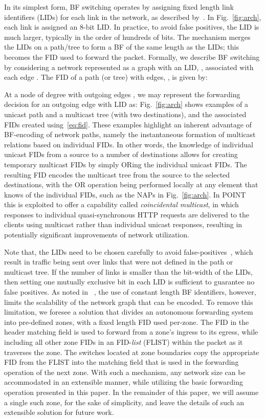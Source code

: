 \documentclass[conference]{IEEEtran}
\newcommand{\figref}[1]{Fig.~\ref{#1}}
\begin{document}
In its simplest form, BF switching operates by assigning fixed length link identifiers (LIDs) for each link in the network, as described by~\cite{Jokela09}.  In \figref{fig:arch}, each link is assigned an 8-bit LID. In practice, to avoid false positives, the LID is much larger, typically in the order of hundreds of bits. The mechanism merges the LIDs on a path/tree to form a BF of the same length as the LIDs; this becomes the FID used to forward the packet.  Formally, we describe BF switching by considering a network represented as a graph  with an LID, , associated with each edge . The FID  of a path (or tree) with  edges, , is given by: 

At a node  of degree  with outgoing edges , we may represent the forwarding decision  for an outgoing edge  with LID  as: 
\figref{fig:arch} shows examples of a unicast path and a multicast tree (with two destinations), and the associated FIDs created using~\eqref{eq:fid}. These examples highlight an inherent advantage of BF-encoding of network paths, namely the instantaneous formation of multicast relations based on individual FIDs. In other words, the knowledge of individual unicast FIDs from a source to a number of destinations allows for creating temporary multicast FIDs by simply ORing the individual unicast FIDs. The resulting FID encodes the multicast tree from the source to the selected destinations, with the OR operation being performed locally at any element that knows of the individual FIDs, such as the NAPs in \figref{fig:arch}. In POINT~\cite{Trossen2015} this is exploited to offer a capability called \emph{coincidental multicast}, in which responses to individual quasi-synchronous HTTP requests are delivered to the clients using multicast rather than individual unicast responses, resulting in potentially significant improvements of network utilization.

Note that, the LIDs need to be chosen carefully to avoid false-positives~\cite{Jokela09}, which result in traffic being sent over links that were not defined in the path or multicast tree. If the number of links  is smaller than the bit-width of the LIDs, then setting one mutually exclusive bit in each LID is sufficient to guarantee no false positives. As noted in ~\cite{Zahemszky2010}, the use of constant length BF identifiers, however, limits the scalability of the network graph that can be encoded. To remove this limitation, we foresee a solution that divides an autonomous forwarding system into pre-defined zones, with a fixed length FID used per-zone. The FID in the header matching field is used to forward from a zone's ingress to its egress, while including all other zone FIDs in an FID-\emph{list} (FLIST) within the packet as it traverses the zone. The switches located at zone boundaries copy the appropriate FID from the FLIST into the matching field that is used in the forwarding operation of the next zone. With such a mechanism, any network size can be accommodated in an extensible manner, while utilizing the basic forwarding operation presented in this paper. In the remainder of this paper, we will assume a single such zone, for the sake of simplicity, and leave the details of such an extensible solution for future work.
\end{document}
